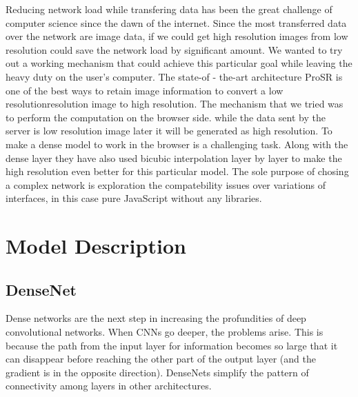 \documentclass[a4paper,12pt]{article}
\begin{document}
Reducing network load while transfering data has been the great challenge of computer science since the dawn of the internet. Since the most transferred data over the network are image data, if we could get high resolution images from low resolution could save the network load by significant amount. We wanted to try out a working mechanism that could achieve this particular goal while leaving the heavy duty on the user's computer. The state-of - the-art architecture ProSR is one of the best ways to retain image information to convert a low resolutionresolution image to high resolution. The mechanism that we tried was to perform the computation on the browser side. while the data sent by the server is low resolution image later it will be generated as high resolution. To make a dense model to work in the browser is a challenging task. Along with the dense layer they have also used bicubic interpolation layer by layer to make the high resolution even better for this particular model. The sole purpose of chosing a complex network is exploration the compatebility issues over variations of interfaces, in this case pure JavaScript without any libraries.


\section{Model Description}

\subsection{DenseNet}
Dense networks are the next step in increasing the profundities of deep convolutional networks. When CNNs go deeper, the problems arise. This is because the path from the input layer for information becomes so large that it can disappear before reaching the other part of the output layer (and the gradient is in the opposite direction). DenseNets simplify the pattern of connectivity among layers in other architectures. 
\end{document}
